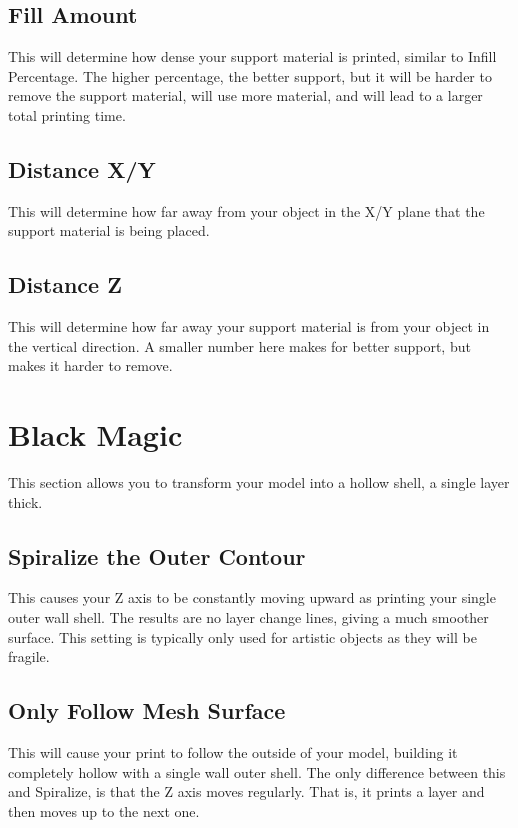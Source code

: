 \subsection{Fill Amount}
This will determine how dense your support material is printed, similar to Infill Percentage. The higher percentage, the better support, but it will be harder to remove the support material, will use more material, and will lead to a larger total printing time.

\subsection{Distance X/Y}
This will determine how far away from your object in the X/Y plane that the support material is being placed.

\subsection{Distance Z}
This will determine how far away your support material is from your object in the vertical direction. A smaller number here makes for better support, but makes it harder to remove.

\section{Black Magic}
This section allows you to transform your model into a hollow shell, a single layer thick.

\subsection{Spiralize the Outer Contour}
This causes your Z axis to be constantly moving upward as printing your single outer wall shell. The results are no layer change lines, giving a much smoother surface. This setting is typically only used for artistic objects as they will be fragile.

\subsection{Only Follow Mesh Surface}
This will cause your print to follow the outside of your model, building it completely hollow with a single wall outer shell. The only difference between this and Spiralize, is that the Z axis moves regularly. That is, it prints a layer and then moves up to the next one.

